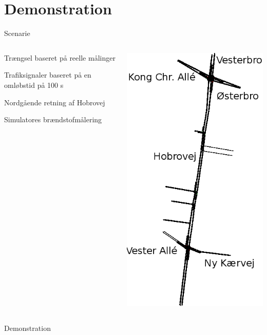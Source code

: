 \section{Demonstration}
\begin{frame}{Scenarie}
\begin{columns}
\begin{column}{0.6\textwidth}
Trængsel baseret på reelle målinger

Trafiksignaler baseret på en omløbstid på 100 s 

Nordgående retning af Hobrovej

Simulatores brændstofmålering
\end{column}

\begin{column}{0.4\textwidth}
\includegraphics[width=1\textwidth]{images/Hobrovej.png}
\end{column}
\end{columns}
\end{frame}

\begin{frame}{Demonstration}
\end{frame}